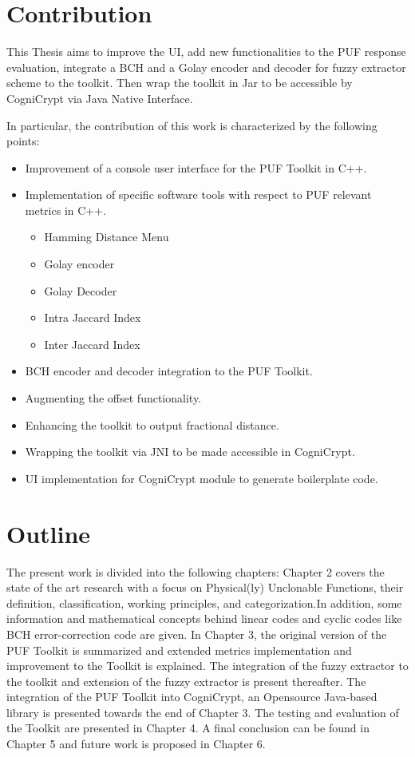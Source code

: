 \section{Contribution}
This Thesis aims to improve the UI, add new functionalities to the PUF response evaluation, integrate a BCH and a Golay encoder and decoder for fuzzy extractor scheme to the toolkit.
Then wrap the toolkit in Jar to be accessible by CogniCrypt via Java Native Interface.

In particular, the contribution of this work is characterized by the following points:

\begin{itemize}
	\item Improvement of a console user interface for the PUF Toolkit in C++.
	\item Implementation of specific software tools with respect to PUF relevant metrics in C++.
		\begin{itemize}
			\item Hamming Distance Menu
			\item Golay encoder 
			\item Golay Decoder
			\item Intra Jaccard Index
			\item Inter Jaccard Index
		\end{itemize}
	\item BCH encoder and decoder integration to the PUF Toolkit.
	\item Augmenting the offset functionality.
	\item Enhancing the toolkit to output fractional distance.
	\item Wrapping the toolkit via JNI to be made accessible in CogniCrypt.
	\item UI implementation for CogniCrypt module to generate boilerplate code.
\end{itemize}

\section{Outline}
The present work is divided into the following chapters: Chapter 2 covers the state of the art research with a focus on Physical(ly) Unclonable Functions, their definition, classification, working principles, and categorization.In addition, some information and mathematical concepts behind linear codes and cyclic codes like BCH error-correction code are given. In Chapter 3, the original version of the PUF Toolkit is summarized and extended metrics implementation and improvement
to the Toolkit is explained. The integration of the fuzzy extractor to the toolkit and extension of the fuzzy extractor is present thereafter. The integration of the PUF Toolkit into CogniCrypt, an Opensource Java-based library is presented towards the end of Chapter 3. The testing and evaluation of the Toolkit are presented in Chapter 4. A final conclusion can be found in Chapter 5 and future work is proposed in Chapter 6.
